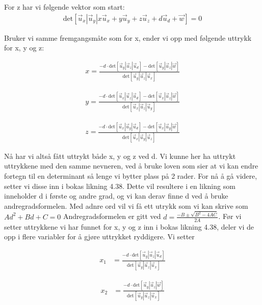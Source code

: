 For z har vi følgende vektor som start: 
\begin{align} \label{eq:detx}
	\text{det}[\vec{u}_x|\vec{u}_y |x\vec{u}_x + y\vec{u}_y + z\vec{u}_z + d\vec{u}_d + \vec{w}]=0
\end{align}

Bruker vi samme fremgangsmåte som for x, ender vi opp med følgende uttrykk for x, y og z: 

\begin{align}
    x=\frac{-d\cdot\text{det}[\vec{u}_y|\vec{u}_z | \vec{u}_d] 
	-\text{det}[\vec{u}_y|\vec{u}_z | \vec{w}]}{\text{det}[\vec{u}_y|\vec{u}_z | \vec{u}_x]}
\end{align}

\begin{align}
    y=\frac{-d\cdot\text{det}[\vec{u}_x|\vec{u}_z | \vec{u}_d] 
	-\text{det}[\vec{u}_x|\vec{u}_z | \vec{w}]}{\text{det}[\vec{u}_x|\vec{u}_z | \vec{u}_y]}
\end{align}

\begin{align}
    z=\frac{-d\cdot\text{det}[\vec{u}_x|\vec{u}_y | \vec{u}_d] 
	-\text{det}[\vec{u}_x|\vec{u}_y | \vec{w}]}{\text{det}[\vec{u}_x|\vec{u}_y | \vec{u}_z]}
\end{align}

Nå har vi altså fått uttrykt både x, y og z ved d. Vi kunne her ha uttrykt uttrykkene med den samme nevneren, ved å bruke loven som sier at vi kan endre fortegn til en determinant så lenge vi bytter plass på 2 rader. For nå å gå videre, setter vi disse inn i bokas likning 4.38. Dette vil resultere i en likning som inneholder d i første og andre grad, og vi kan derav finne d ved å bruke andregradsformelen. Med adnre ord vil vi få ett utrykk som vi kan skrive som $Ad^2+Bd+C=0$ Andregradsformelen er gitt ved $d=\frac{-B \pm \sqrt{B^2-4AC}}{2A}$. Før vi setter uttrykkene vi har funnet for x, y og z inn i bokas likning 4.38, deler vi de opp i flere variabler for å gjøre uttrykket ryddigere. Vi setter

\begin{align}
	x_1&=\frac{-d\cdot\text{det}[\vec{u}_y|\vec{u}_z | \vec{u}_d]}{\text{det}[\vec{u}_y|\vec{u}_z | \vec{u}_x]}\nonumber 
\end{align}

\begin{align}
	x_2&=\frac{-d\cdot\text{det}[\vec{u}_y|\vec{u}_z | \vec{w}]}{\text{det}[\vec{u}_y|\vec{u}_z | \vec{u}_x]}\nonumber 
\end{align}

